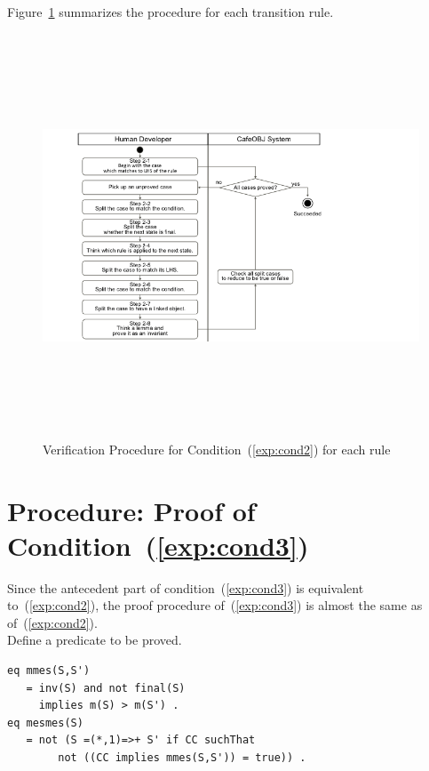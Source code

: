 \documentclass[12pt]{report}
\begin{document}
Figure~\ref{fig:procedure2} summarizes the procedure for each transition rule.
\begin{figure}
\centering
\includegraphics[height=12cm,natwidth=720,natheight=405,clip,trim=60 0 180 0]{procedure2.png}
\caption{Verification Procedure for Condition~(\ref{exp:cond2}) for each rule}
\label{fig:procedure2}
\end{figure}

\section{Procedure: Proof of Condition~(\ref{exp:cond3})}
\label{sec:mesmes}
Since the antecedent part of condition~(\ref{exp:cond3}) is equivalent
to~(\ref{exp:cond2}), the proof procedure of~(\ref{exp:cond3}) is
almost the same as of~(\ref{exp:cond2}). \\

 Define a predicate to be proved.
\begin{verbatim}
eq mmes(S,S')
   = inv(S) and not final(S)
     implies m(S) > m(S') .
eq mesmes(S)
   = not (S =(*,1)=>+ S' if CC suchThat
        not ((CC implies mmes(S,S')) = true)) .
\end{verbatim}
\end{document}
